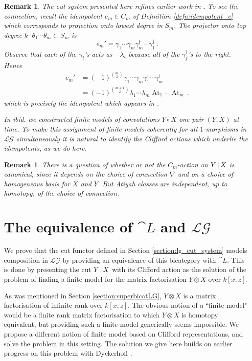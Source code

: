 \documentclass[english,letter paper,12pt,leqno]{article}
\theoremstyle{example}
\newtheorem{remark}[theorem]{Remark}
\numberwithin{equation}{section}
\def\LG{\mathcal{LG}}
\DeclareMathOperator{\At}{At}
\begin{document}
\begin{remark}\label{remark:relation_to_toby_paper} The cut system presented here refines earlier work in \cite{dm1102.2957}. To see the connection, recall the idempotent $e_m \in C_m$ of Definition \ref{defn:idempotent_e} which corresponds to projection onto lowest degree in $S_m$. The projector onto top degree $k \cdot \theta_1 \cdots \theta_m \subset S_m$ is 
\[
e_m' = \gamma_1 \cdots \gamma_m \gamma_m^\dagger \cdots \gamma_1^\dagger\,.
\]
Observe that each of the $\gamma_i$'s acts as $- \lambda_i$ because all of the $\gamma_j^\dagger$'s to the right. Hence
\begin{align*}
e_m' &= (-1)^{\binom{m}{2}} \gamma_1 \cdots \gamma_m \gamma_1^\dagger \cdots \gamma_m^\dagger \\
&= (-1)^{\binom{m+1}{2}} \lambda_1 \cdots \lambda_m \At_1 \cdots \At_m\,.
\end{align*}
which is precisely the idempotent which appears in \cite[Corollary 10.4]{dm1102.2957}.

In \emph{ibid.} we constructed finite models of convolutions $Y \circ X$ one pair $(Y,X)$ at time. To make this assignment of finite models coherently for all $1$-morphisms in $\LG$ simultaneously it is natural to identify the Clifford actions which underlie the idempotents, as we do here.
\end{remark}

\begin{remark} There is a question of whether or not the $C_m$-action on $Y \,|\, X$ is canonical, since it depends on the choice of connection $\nabla$ and on a choice of homogeneous basis for $X$ and $Y$. But Atiyah classes are independent, up to homotopy, of the choice of connection.
\end{remark}

\section{The equivalence of $\cat{L}$ and $\LG$}\label{section:equivllg}

We prove that the cut functor defined in Section \ref{section:lg_cut_system} models composition in $\LG$ by providing an equivalence of this bicategory with $\cat{L}$. This is done by presenting the cut $Y \,|\, X$ with its Clifford action as the solution of the problem of finding a finite model for the matrix factorisation $Y \otimes X$ over $k[x,z]$.

As was mentioned in Section \ref{section:superbicatLG}, $Y \otimes X$ is a matrix factorisation of infinite rank over $k[x,z]$. The obvious notion of a ``finite model'' would be a finite rank matrix factorisation to which $Y \otimes X$ is homotopy equivalent, but providing such a finite model generically seems impossible. We propose a different notion of finite model based on Clifford representations, and solve the problem in this setting. The solution we give here builds on earlier progress on this problem with Dyckerhoff \cite{dm1102.2957}. 
\end{document}
